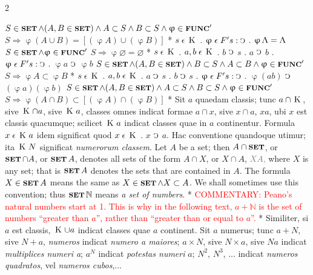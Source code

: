 \documentclass{book}
\newcommand{\C}{\mathop{\sbox0{$\displaystyle$$\reflectbox{C}$} %
\raisebox{-\height+\ht0-0.05cm}[\ht0][\dp0]{\scalebox{0.8}[0.8]{\copy0}}}\displaylimits} %
\newcommand{\abs}{\mathop{\rotatebox[origin=c]{180}{V}}}
\newcommand{\smallIn}{\ensuremath{\mathrel{\epsilon}}}
\newcommand{\K}{\mathop{\thinspace \text{K} \thinspace}}
\newcommand{\setOfSets}{\mathop{\text{{\footnotesize \textbf{SET}}}}}
\newcommand{\func}{\mathord{\text{{\footnotesize \textbf{FUNC}}}}}
\renewcommand{\rightarrow}{\Rightarrow}
\newcommand\irrelevant[1]{\textcolor{gray}{#1}}
\newcommand\commentary[1]{\textcolor{red}{COMMENTARY: #1}}
\newenvironment{translateTwoCol}
               { %
                 \columnratio{0.5, 0.5}
                 \begin{paracol}{2}
                 \newcommand{\LAT}{\switchcolumn[0]*}
                 \newcommand{\ENG}{\switchcolumn[1]}
               }
               { %
                 \let\ENG\undefined
                 \let\LAT\undefined
                 \end{paracol}
               }
\begin{document}
\begin{translateTwoCol}
\ENG
\hspace{1.06cm} $S \in \setOfSets \wedge (A, B \in \setOfSets) \wedge A \subset S \wedge B \subset S \wedge \upvarphi \in \func'$ $S \rightarrow \upvarphi (A \cup B) = [(\upvarphi A) \cup (\upvarphi B)]$
\LAT
\hspace{1.06cm} $s \smallIn \K$ . $\upvarphi \smallIn F' s : \C$ . $\upvarphi \abs = \abs$
\ENG
\hspace{1.06cm} $S \in \setOfSets \wedge \upvarphi \in \func'$ $S \rightarrow \upvarphi \varnothing = \varnothing$
\LAT
\hspace{1.06cm} $s \smallIn \K$ . $a,b \smallIn \K$ . $b$ $\C$ $s$ . $a$ $\C$ $b$ . $\upvarphi \smallIn F' s : \C$ . $\upvarphi a$ $\C$ $\upvarphi b$
\ENG
\hspace{1.06cm} $S \in \setOfSets \wedge (A, B \in \setOfSets) \wedge B \subset S \wedge A \subset B \wedge \upvarphi \in \func'$ $S \rightarrow \upvarphi A \subset \upvarphi B$
\LAT
\hspace{1.06cm} $s \smallIn \K$ . $a,b \smallIn \K$ . $a$ $\C$ $s$ . $b$ $\C$ $s$ . $\upvarphi \smallIn F' s : \C$ . $\upvarphi (ab)$ $\C$ $(\upvarphi a)(\upvarphi b)$
\ENG
\hspace{1.06cm} $S \in \setOfSets \wedge (A, B \in \setOfSets) \wedge A \subset S \wedge B \subset S \wedge \upvarphi \in \func'$ $S \rightarrow \upvarphi (A \cap B) \subset [(\upvarphi A) \cap (\upvarphi B)]$
\LAT
Sit $a$ quaedam classis; tunc $a \cap \K$, sive $\K \cap a$, sive $\K a$, classes omnes indicat formae $a \cap x$, sive $x \cap a$, $x a$, ubi $x$ est classis quacumque; scilicet $\K a$ indicat classes quae in $a$ continentur. Formula $x \smallIn \K a$ idem significat quod $x \smallIn \K$ . $x$ $\C$ $a$. Hac conventione quandoque utimur; ita $\K N$ significat \emph{numerorum classem}.
\ENG
Let $A$ be a set; then $A \cap \setOfSets$, or $\setOfSets \cap A$, or $\setOfSets A$, denotes all sets of the form $A \cap X$, or $X \cap A$,\irrelevant{ $X A$,} where $X$ is any set; that is $\setOfSets A$ denotes the sets that are contained in $A$. The formula $X \in \setOfSets A$ means the same as  $X \in \setOfSets \wedge X \subset A$. We shall sometimes use this convention; thus $\setOfSets \mathbb{N}$ means \emph{a set of numbers}.
\LAT
\ENG
\commentary{Peano's natural numbers start at 1. This is why in the following text, $a + \mathbb{N}$ is the set of numbers ``greater than $a$'', rather than ``greater than or equal to $a$''.}
\LAT
Similiter, si $a$ est classis, $\K \cup a$ indicat classes quae $a$ continent. Sit $a$ numerus; tunc $a + N$, sive $N + a$, \emph{numeros} indicat \emph{numero a maiores}; $a \times N$, sive $N \times a$, sive $N a$ indicat \emph{multiplices numeri a}; $a^N$ indicat \emph{potestas numeri} $a$; $N^2$, $N^3$, ... indicat \emph{numeros quadratos}, vel \emph{numeros cubos},...

\end{translateTwoCol}
\end{document}
